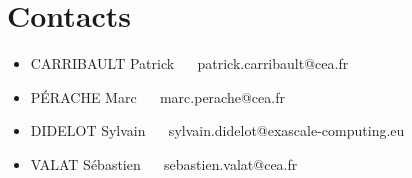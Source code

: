 \documentclass[a4paper,11pt]{article}
\begin{document}
\section{Contacts}
\begin{itemize}
  \item CARRIBAULT Patrick $\quad$ patrick.carribault@cea.fr
  \item P\'{E}RACHE Marc $\quad$ marc.perache@cea.fr
  \item DIDELOT Sylvain $\quad$ sylvain.didelot@exascale-computing.eu
  \item VALAT S\'{e}bastien $\quad$ sebastien.valat@cea.fr
\end{itemize}


\end{document}
